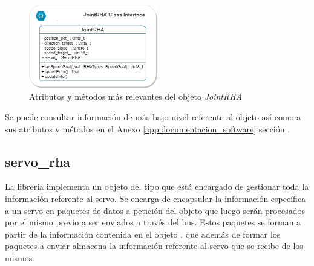         \begin{figure}[H]
            \centering
            \includegraphics[width=0.5\textwidth]{figuras/Imagenes_SW/class_diagram_JRHA.png}   
            \caption{Atributos y métodos más relevantes del objeto \textit{JointRHA}}
            \label{fig:SW:class_diagram_JRHA}
        \end{figure}
        
        Se puede consultar información de más bajo nivel referente al objeto  así como a sus atributos y métodos en el Anexo \ref{app:documentacion_software} sección \completar.
        
    \subsection{servo\_rha} \label{subsec:SW:lib:servo_rha}
        La librería  implementa un objeto del tipo  que está encargado de gestionar toda la información referente al servo. Se encarga de encapsular la información específica a un servo en paquetes de datos a petición del objeto  que luego serán procesados por el mismo previo a ser enviados a través del bus. Estos paquetes se forman a partir de la información contenida en el objeto , que además de formar los paquetes a enviar almacena la información referente al servo que se recibe de los mismos. 
        \\
        
